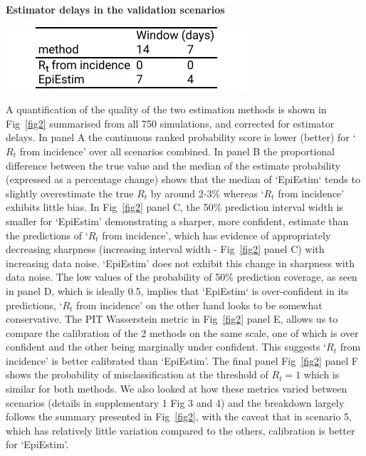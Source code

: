 \documentclass[10pt,letterpaper]{article}
\begin{document}
\begin{table}[!ht]
\caption{{\bf Estimator delays in the validation scenarios}}
\centerline{\includegraphics{fig/tab1-lags}}
\label{tab1}
\end{table}

A quantification of the quality of the two estimation methods is shown in Fig~\ref{fig2} summarised from all 750 simulations, and corrected for estimator delays. In panel A the continuous ranked probability score is lower (better) for `$R_t$ from incidence' over all scenarios combined. In panel B the proportional difference between the true value and the median of the estimate probability (expressed as a percentage change) shows that the median of `EpiEstim` tends to slightly overestimate the true $R_t$ by around 2-3\% whereas `$R_t$ from incidence' exhibits little bias. In Fig~\ref{fig2} panel C, the 50\% prediction interval width is smaller for `EpiEstim' demonstrating a sharper, more confident, estimate than the predictions of `$R_t$ from incidence', which has evidence of appropriately decreasing sharpness (increasing interval width - Fig~\ref{fig2} panel C) with increasing data noise. `EpiEstim' does not exhibit this change in sharpness with data noise. The low values of the probability of 50\% prediction coverage, as seen in panel D, which is ideally 0.5, implies that `EpiEstim` is over-confident in its predictions, `$R_t$ from incidence' on the other hand looks to be somewhat conservative. The PIT Wasserstein metric in Fig~\ref{fig2} panel E, allows us to compare the calibration of the 2 methods on the same scale, one of which is over confident and the other being marginally under confident. This suggests `$R_t$ from incidence' is better calibrated than `EpiEstim'. The final panel Fig~\ref{fig2} panel F shows the probability of misclassification at the threshold of $R_t=1$ which is similar for both methods. We also looked at how these metrics varied between scenarios (details in supplementary 1 Fig 3 and 4) and the breakdown largely follows the summary presented in Fig~\ref{fig2}, with the caveat that in scenario 5, which has relatively little variation compared to the others, calibration is better for `EpiEstim'.
\end{document}
